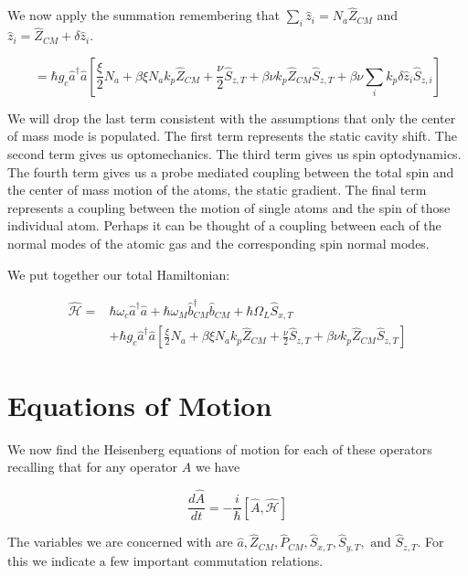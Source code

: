 \documentclass[12pt]{article}
\begin{document}
We now apply the summation remembering that $\sum_i \hat{z}_i = N_a \hat{Z}_{CM}$ and $\hat{z}_i = \hat{Z}_{CM} + \delta \hat{z}_i$.

\begin{equation}
= \hbar g_c \hat{a}^{\dag} \hat{a} \left[
\frac{\xi}{2} N_a 
+ \beta \xi N_a k_p \hat{Z}_{CM} 
+ \frac{\nu}{2} \hat{S}_{z,T}
+ \beta \nu k_p \hat{Z}_{CM} \hat{S}_{z,T}
+ \beta \nu \sum_i k_p \delta \hat{z}_i \hat{S}_{z,i}
\right]
\end{equation}

We will drop the last term consistent with the assumptions that only the center of mass mode is populated. The first term represents the static cavity shift. The second term gives us optomechanics. The third term gives us spin optodynamics. The fourth term gives us a probe mediated coupling between the total spin and the center of mass motion of the atoms, the static gradient. The final term represents a coupling between the motion of single atoms and the spin of those individual atom. Perhaps it can be thought of a coupling between each of the normal modes of the atomic gas and the corresponding spin normal modes.

We put together our total Hamiltonian:

\begin{align}
 \widehat{\mathcal{H}} =& 
\hbar \omega_c \hat{a}^{\dag} \hat{a} 
+ \hbar \omega_M \hat{b}^{\dag}_{CM} \hat{b}_{CM} 
+ \hbar \Omega_L \hat{S}_{x,T} \\
&+ \hbar g_c \hat{a}^{\dag} \hat{a} \left[
\frac{\xi}{2} N_a 
+ \beta \xi N_a k_p \hat{Z}_{CM} 
+ \frac{\nu}{2} \hat{S}_{z,T}
+ \beta \nu k_p \hat{Z}_{CM} \hat{S}_{z,T}
\right]
\end{align}

\section{Equations of Motion}

We now find the Heisenberg equations of motion for each of these operators recalling that for any operator $\hat{A}$ we have

\[ \frac{d \hat{A}}{dt} = -\frac{i}{\hbar} [ \hat{A}, \hat{\mathcal{H}}] \]

The variables we are concerned with are $\hat{a}, \hat{Z}_{CM}, \hat{P}_{CM}, \hat{S}_{x,T}, \hat{S}_{y,T}, \text{ and } \hat{S}_{z,T}$.
For this we indicate a few important commutation relations.
\end{document}
